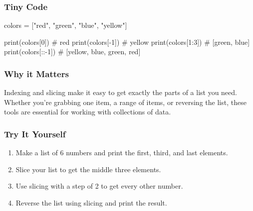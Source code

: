 \documentclass[
  letterpaper,
  DIV=11,
  numbers=noendperiod]{scrreprt}
\newenvironment{Shaded}{\begin{snugshade}}{\end{snugshade}}
\newcommand{\BuiltInTok}[1]{\textcolor[rgb]{0.00,0.23,0.31}{#1}}
\newcommand{\CommentTok}[1]{\textcolor[rgb]{0.37,0.37,0.37}{#1}}
\newcommand{\DecValTok}[1]{\textcolor[rgb]{0.68,0.00,0.00}{#1}}
\newcommand{\NormalTok}[1]{\textcolor[rgb]{0.00,0.23,0.31}{#1}}
\newcommand{\OperatorTok}[1]{\textcolor[rgb]{0.37,0.37,0.37}{#1}}
\newcommand{\StringTok}[1]{\textcolor[rgb]{0.13,0.47,0.30}{#1}}
\providecommand{\tightlist}{%
  \setlength{\itemsep}{0pt}\setlength{\parskip}{0pt}}
\begin{document}
\subsubsection{Tiny Code}\label{tiny-code-22}

\begin{Shaded}
\begin{Highlighting}[]
\NormalTok{colors }\OperatorTok{=}\NormalTok{ [}\StringTok{"red"}\NormalTok{, }\StringTok{"green"}\NormalTok{, }\StringTok{"blue"}\NormalTok{, }\StringTok{"yellow"}\NormalTok{]}

\BuiltInTok{print}\NormalTok{(colors[}\DecValTok{0}\NormalTok{])     }\CommentTok{\# red}
\BuiltInTok{print}\NormalTok{(colors[}\OperatorTok{{-}}\DecValTok{1}\NormalTok{])    }\CommentTok{\# yellow}
\BuiltInTok{print}\NormalTok{(colors[}\DecValTok{1}\NormalTok{:}\DecValTok{3}\NormalTok{])   }\CommentTok{\# [\textquotesingle{}green\textquotesingle{}, \textquotesingle{}blue\textquotesingle{}]}
\BuiltInTok{print}\NormalTok{(colors[::}\OperatorTok{{-}}\DecValTok{1}\NormalTok{])  }\CommentTok{\# [\textquotesingle{}yellow\textquotesingle{}, \textquotesingle{}blue\textquotesingle{}, \textquotesingle{}green\textquotesingle{}, \textquotesingle{}red\textquotesingle{}]}
\end{Highlighting}
\end{Shaded}

\subsubsection{Why it Matters}\label{why-it-matters-22}

Indexing and slicing make it easy to get exactly the parts of a list you
need. Whether you're grabbing one item, a range of items, or reversing
the list, these tools are essential for working with collections of
data.

\subsubsection{Try It Yourself}\label{try-it-yourself-22}

\begin{enumerate}
\def\labelenumi{\arabic{enumi}.}
\tightlist
\item
  Make a list of 6 numbers and print the first, third, and last
  elements.
\item
  Slice your list to get the middle three elements.
\item
  Use slicing with a step of 2 to get every other number.
\item
  Reverse the list using slicing and print the result.
\end{enumerate}
\end{document}
